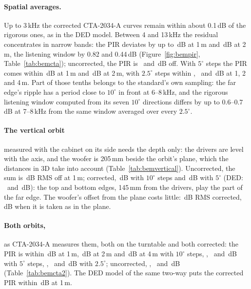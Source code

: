 \documentclass[11pt,a4paper]{article}
\begin{document}
\paragraph{Spatial averages.} Up to 3\,kHz the corrected CTA-2034-A curves remain within about 0.1\,dB of
the rigorous ones, as in the DED model. Between 4 and 13\,kHz the residual concentrates in narrow bands:
the PIR deviates by up to \bemPirCorOne\,dB at 1\,m and \bemPirCorTwo\,dB at 2\,m, the listening window by
0.82 and 0.44\,dB (Figure~\ref{fig:bempir}, Table~\ref{tab:bemcta}); uncorrected, the PIR is
\bemPirRawOne\ and \bemPirRawTwo\,dB off. With $5^\circ$ steps the PIR comes within \bemPirFiveOne\,dB
at 1\,m and \bemPirFiveTwo\,dB at 2\,m, with $2.5^\circ$ steps within \bemPirFineOne, \bemPirFineTwo\ and
\bemPirFineFour\,dB at 1, 2 and 4\,m. Part of those tenths belongs to the standard's own sampling: the
far edge's ripple has a period close to $10^\circ$ in front at 6--8\,kHz, and the rigorous listening
window computed from its seven $10^\circ$ directions differs by up to 0.6--0.7\,dB at 7--8\,kHz from the
same window averaged over every $2.5^\circ$.

\paragraph{The vertical orbit} measured with the cabinet on its side needs the depth only: the drivers are
level with the axis, and the woofer is 205\,mm beside the orbit's plane, which the distances in 3D take
into account (Table~\ref{tab:bemvertical}). Uncorrected, the sum is \bemSysVertRawOne\,dB RMS off at
1\,m; corrected, \bemSysVertCorOne\,dB with $10^\circ$ steps and \bemSysVertFiveOne\,dB with $5^\circ$ (DED:
\dedSysVertCorOne\ and \dedSysVertFiveOne\,dB): the top and bottom edges, 145\,mm from the drivers, play
the part of the far edge. The woofer's offset from the plane costs little: \bemWfVertCorOne\,dB RMS
corrected, \bemWfVertFlatOne\,dB when it is taken as in the plane.

\paragraph{Both orbits,} as CTA-2034-A measures them, both on the turntable and both corrected: the PIR is
within \bemPirBothCorOne\,dB at 1\,m, \bemPirBothCorTwo\,dB at 2\,m and \bemPirBothCorFour\,dB at 4\,m
with $10^\circ$ steps, \bemPirBothFiveOne, \bemPirBothFiveTwo\ and \bemPirBothFiveFour\,dB with
$5^\circ$ steps, \bemPirBothFineOne, \bemPirBothFineTwo\ and \bemPirBothFineFour\,dB with $2.5^\circ$;
uncorrected, \bemPirBothRawOne, \bemPirBothRawTwo\ and \bemPirBothRawFour\,dB (Table~\ref{tab:bemcta2}).
The DED model of the same two-way puts the corrected PIR within \dedPirBothCorOne\,dB at 1\,m.
\end{document}
